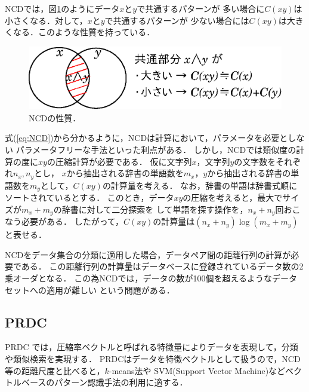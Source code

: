 NCDでは，図\ref{ncd}のようにデータ$x$と$y$で共通するパターンが
多い場合に$C(xy)$は小さくなる．対して，$x$と$y$で共通するパターンが
少ない場合には$C(xy)$は大きくなる．このような性質を持っている．

\begin{figure}[tb]
\begin{center}
\includegraphics[width=13.5cm]{image/ncd.eps}
\end{center}
\caption{NCDの性質．}
\label{ncd}
\end{figure}

式(\ref{eq:NCD})から分かるように，NCDは計算において，パラメータを必要としない
パラメータフリーな手法といった利点がある．
しかし，NCDでは類似度の計算の度に$xy$の圧縮計算が必要である．
仮に文字列$x$，文字列$y$の文字数をそれぞれ$n_x, n_y$とし，
$x$から抽出される辞書の単語数を$m_x$，$y$から抽出される辞書の単語数を$m_y$として，$C(xy)$の計算量を考える．
なお，辞書の単語は辞書式順にソートされているとする．
このとき，データ$xy$の圧縮を考えると，最大でサイズが$m_x + m_y$の辞書に対して二分探索を
して単語を探す操作を，$n_x + n_y$回おこなう必要がある．
したがって，$C(xy)$の計算量は$(n_x + n_y)\log(m_x + m_y)$と表せる．

NCDをデータ集合の分類に適用した場合，データペア間の距離行列の計算が必要である．
この距離行列の計算量はデータベースに登録されているデータ数の2乗オーダとなる．
この為NCDでは，データの数が100個を超えるようなデータセットへの適用が難しい
という問題がある．




\subsection{PRDC}
PRDC \cite{PRDC} では，圧縮率ベクトルと呼ばれる特徴量によりデータを表現して，分類や類似検索を実現する．
PRDCはデータを特徴ベクトルとして扱うので，NCD等の距離尺度と比べると，$k$-means法や
SVM(Support Vector Machine)などベクトルベースのパターン認識手法の利用に適する．

